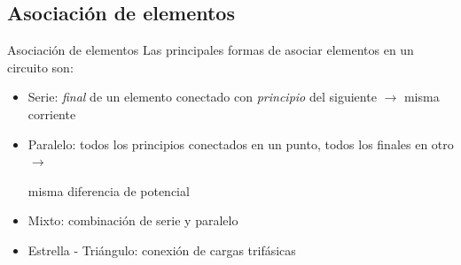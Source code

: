 \documentclass[aspectratio=169, xcolor={usenames,svgnames,dvipsnames}]{beamer}
\begin{document}

\subsection{Asociación de elementos}

\begin{frame}{Asociación de elementos}
    Las principales formas de asociar elementos en un circuito son:
    \vspace{3mm}
    \begin{itemize}
        \item \alert{Serie}: \textit{final}  de un elemento conectado con \textit{principio} del siguiente $\rightarrow$ \alert{misma corriente}
        \vspace{3mm}
        \item \alert{Paralelo}: todos los principios conectados en un punto, todos los finales en otro $\rightarrow$ 
        
        \hspace{15.5mm} \alert{misma diferencia de potencial}
        \vspace{3mm}
        \item \alert{Mixto}: combinación de serie y paralelo
        \vspace{3mm}
        \item \alert{Estrella - Triángulo}: conexión de cargas trifásicas
    \end{itemize}    
\end{frame}

\end{document}
